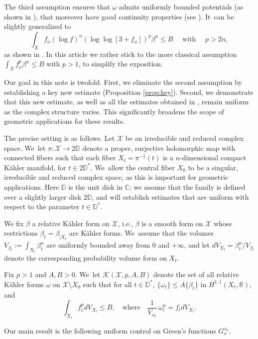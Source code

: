 \documentclass[11pt]{article}
\newcommand{\ie}{i.e.,\xspace}
\numberwithin{equation}{section}
\theoremstyle{definition}
\newcommand{\C}{\mathbb C}
\newcommand{\R}{\mathbb R}
\begin{document}
The third assumption ensures that $\omega$ admits uniformly bounded potentials
(as shown in \cite{Kol98,EGZ08,DP10}), that moreover
have good continuity properties (see \cite{Kol08,DDGHKZ14,GPTW21,GGZ23}). It~can be slightly generalized to
\[
\int_X f_{\omega} (\log f)^n (\log \log [3+f_{\omega}])^p \beta^n \leq B
\quad \text{ with } \quad
p>2n,
\]
as shown in \cite{GGZ23}. In this article we rather stick to the more classical assumption
$\int_X f_{\omega}^p \beta^n \leq B$ with $p>1$, to simplify the exposition.

Our goal in this note is twofold.
First, we eliminate the second assumption by establishing a key new estimate (Proposition \ref{prop:key}).
Second, we demonstrate that this new estimate, as well as all the estimates obtained in \cite{GPS22,GPSS22,GPSS23},
remain uniform as the complex structure varies.
This significantly broadens the scope of geometric applications for these results.

The precise setting is as follows.
Let $\mathcal{X}$ be an irreducible and reduced complex space. We~let $\pi:{\mathcal X} \rightarrow 2 \mathbb D$
denote a proper, surjective holomorphic map with connected fibers such that each fiber $X_t=\pi^{-1}(t)$ is a $n$-dimensional
compact Kähler manifold, for $t\in 2 \mathbb D^*$. We~allow the central fiber $X_0$ to be a singular, irreducible and reduced complex space, as this is important for geometric applications.
Here $\mathbb D$ is the unit disk in $\C$; we assume that the family is defined over a slightly larger disk
$2 \mathbb D$, and will establish estimates that are uniform with respect to the parameter $t \in \mathbb D^*$.

We fix $\beta$ a relative Kähler form on $\mathcal{X}$, \ie
$\beta$ is a smooth form on $\mathcal{X}$ whose restrictions $\beta_t=\beta_{|X_t}$ are Kähler forms. We~assume that the volumes $V_{\beta_t}:=\int_{X_t} \beta_t^n$ are uniformly bounded away from 0 and $+ \infty $, and let $dV_{X_t}=\beta_t^n /V_{\beta_t}$ denote the corresponding probability volume form on $X_t$.

Fix $p>1$ and $A,B>0$. We~let ${\mathcal K}(\mathcal{X},p,A,B)$ denote the set of all relative Kähler forms $\omega$ on
$\mathcal{X}\setminus X_0 $ such that for all $t \in \mathbb D^*$, $\{\omega_t\}\leq A\{\beta_t\}$ in $H^{1,1}(X_t,\R)$, and\vspace*{-3pt}
\[
\int_{X_t} f_t^p dV_{X_t} \leq B,
\quad \text{where} \quad
\frac{1}{V_{\omega_t}}\, \omega_t^n=f_t dV_{X_t}.
\]

Our main result is the following uniform control on Green's functions $G_x^{\omega_t}$.
\end{document}

